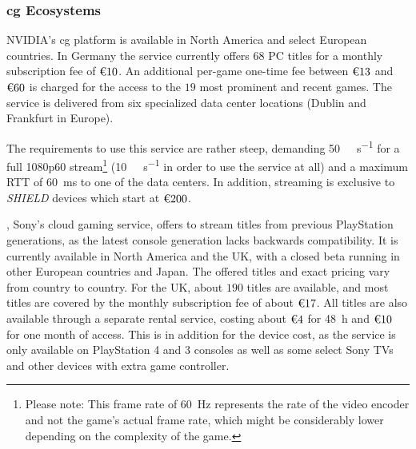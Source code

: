 


\subsubsection{\Gls{cg} Ecosystems}


NVIDIA's \gls{cg} platform%
\gfnow
is available in North America and select European countries.
In Germany the service currently offers $68$ PC titles
for a monthly subscription fee of $\text{\texteuro} 10$. An additional
per-game one-time fee between $\text{\texteuro} 13$ and
$\text{\texteuro} 60$ is charged for the access to the $19$ most
prominent and recent games. The service is delivered from six
specialized data center locations (Dublin and Frankfurt in Europe).

The requirements to use this service are rather steep, demanding
\SI{50}{\mega\bit\per\second} for a full
1080p60 stream\footnote{\label{foot:rate}Please note: This frame rate of
\SI{60}{\hertz} represents the rate of the video encoder and not the
game's actual frame rate, which might be considerably lower depending on
the complexity of the game.} (\SI{10}{\mega\bit\per\second} in
order to use the service at all) and a maximum \acrshort{RTT} of
\SI{60}{\milli\second} to one of the data centers. In addition,
streaming is exclusive to \textit{SHIELD} devices which start at
$\text{\texteuro} 200$.


\psnow, Sony's cloud gaming service, offers to stream titles from previous
PlayStation generations, as the latest console generation lacks
backwards compatibility. It is currently available in North America and
the UK, with a closed beta running in other European countries and
Japan. The offered titles and exact pricing vary from country to
country. For the UK, about $190$ titles are available, and most titles
are covered by the monthly subscription fee of about $\text{\texteuro}
17$. All titles are also available through a separate rental service,
costing about $\text{\texteuro} 4$ for \SI{48}{\hour} and
$\text{\texteuro} 10$ for one month of access. This is in addition for
the device cost, as the service is only available on PlayStation 4 and 3
consoles as well as some select Sony TVs and other devices with extra
game controller.

